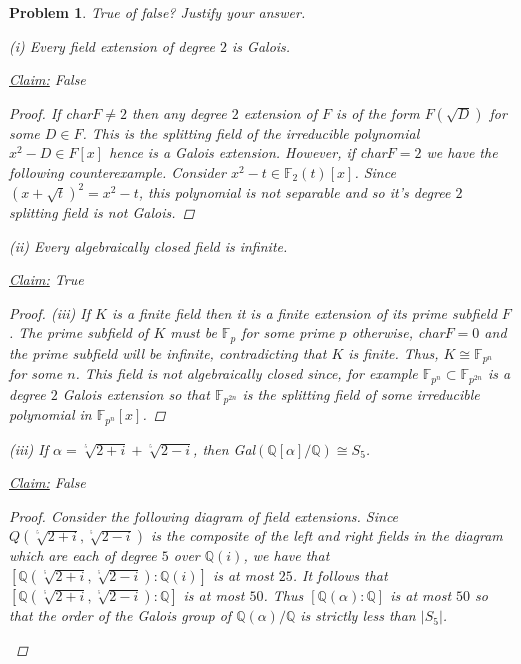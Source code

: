 \documentclass[11pt]{article}
\newcommand{\Q}{\mathbb{Q}}
\newcommand{\1}{\textbf{1}}
\newtheorem{prob}{Problem}
\begin{document}
\begin{prob}
True of false? Justify your answer.

\noindent (i) Every field extension of degree $2$ is Galois.

\noindent\underline{Claim:} False

\begin{proof}
If char$F\neq 2$ then any degree $2$ extension of $F$ is of the form $F(\sqrt{D})$ for some $D\in F$. This is the splitting field of the irreducible polynomial $x^2 - D\in F[x]$ hence is a Galois extension. However, if char$F = 2$ we have the following counterexample. Consider $x^2 - t\in \mathbb{F}_2(t)[x]$. Since $(x + \sqrt{t})^2 = x^2 -t$, this polynomial is not separable and so it's degree $2$ splitting field is not Galois.
\end{proof}

\noindent (ii) Every algebraically closed field is infinite.

\noindent\underline{Claim:} True
\begin{proof}

\noindent (iii) If $K$ is a finite field then it is a finite extension of its prime subfield $F$. The prime subfield of $K$ must be $\mathbb{F}_p$ for some prime $p$ otherwise, char$F = 0$ and the prime subfield will be infinite, contradicting that $K$ is finite. Thus, $K \cong \mathbb{F}_{p^n}$ for some $n$. This field is not algebraically closed since, for example $\mathbb{F}_{p^n}\subset\mathbb{F}_{p^{2n}}$ is a degree $2$ Galois extension so that $\mathbb{F}_{p^{2n}}$ is the splitting field of some irreducible polynomial in $\mathbb{F}_{p^n}[x]$. 

\end{proof}


\noindent (iii) If $\alpha = \sqrt[^5]{2 + i} + \sqrt[^5]{2-i}$, then Gal$(\Q [\alpha]/\Q )\cong S_5$. 

\noindent\underline{Claim:} False
\begin{proof}
Consider the following diagram of field extensions. Since $Q(\sqrt[^5]{2 + i}, \sqrt[^5]{2-i})$ is the composite of the left and right fields in the diagram which are each of degree $5$ over $\Q(i)$, we have that $[\Q(\sqrt[^5]{2 + i}, \sqrt[^5]{2-i}):\Q(i)]$ is at most $25$. It follows that $[\Q(\sqrt[^5]{2 + i}, \sqrt[^5]{2-i}):\Q]$ is at most $50$. Thus $[\Q(\alpha):\Q]$ is at most $50$ so that the order of the Galois group of $\Q(\alpha)/\Q$ is strictly less than $|S_5|$. 

\begin{center}
\begin{tikzpicture}[node distance = 2cm, auto]


\end{tikzpicture}
\end{center}
\end{proof}
\end{prob}
\end{document}
